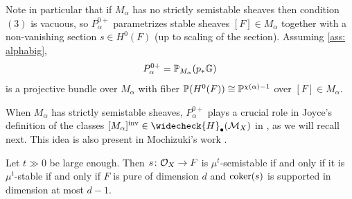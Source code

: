 \documentclass[a4paper, 12pt]{amsart}
\begin{document}
Note in particular that if $M_\alpha$ has no strictly semistable sheaves then condition $(3)$ is vacuous, so $P_\alpha^{0+}$ parametrizes stable sheaves $[F]\in M_\alpha$ together with a non-vanishing section $s\in H^0(F)$ (up to scaling of the section). Assuming \ref{ass: alphabig}, 
\[P_\alpha^{0+}={\mathbb{P}}_{M_\alpha}(p_\ast {\mathbb{G}})\]
 is a projective bundle over $M_\alpha$ with fiber ${\mathbb{P}}(H^0(F))\cong {\mathbb{P}}^{\chi(\alpha)-1}$ over $[F]\in M_\alpha$. 

When $M_\alpha$ has strictly semistable sheaves, $P_\alpha^{0+}$ plays a crucial role in Joyce's definition of the classes $[M_\alpha]^{\mathrm{inv}}\in \widecheck{H}_\bullet(\CM_X)$ in \cite[Section $9.1$]{Jo21}, as we will recall next. This idea is also present in Mochizuki's work \cite{mochizuki}. 

\begin{proposition}[{\cite[Lemma 1.3]{PT}}]
\label{prop: limittinfty}
Let $t\gg 0$ be large enough. Then $s\colon {\mathcal O}_X\to F$ is $\mu^{t}$-semistable if and only if it is $\mu^t$-stable if and only if $F$ is pure of dimension $d$ and $\operatorname{coker}(s)$ is supported in dimension at most $d-1$.
\end{proposition}
\end{document}
